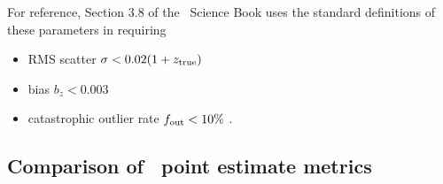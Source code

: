For reference, Section 3.8 of the \lsst\ Science Book \citep{Abell:09} uses the standard definitions of these parameters in requiring
\begin{itemize}
\item RMS scatter $\sigma < 0.02 (1 + z_{\rm true})$
\item bias $b_{z} < 0.003$ %
\item catastrophic outlier rate $f_{\rm out} < 10\%$ %
.
\end{itemize}

\subsection{Comparison of \pz\ point estimate metrics}
\label{sec:pointmetrics_results}

